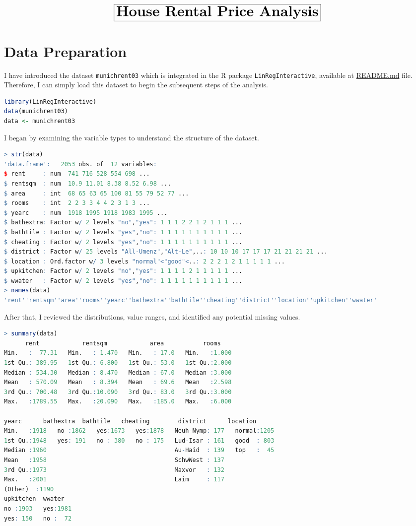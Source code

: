 \documentclass[15pt,a4paper]{report}
\begin{document}
\[
	\boxed{\huge \textbf{House Rental Price Analysis}}
\]
\section*{Data Preparation}
I have introduced the dataset \lstinline[language=R]|munichrent03| which is integrated in the R package \lstinline[language=R]|LinRegInteractive|, available at \href{https://github.com/taitran0102/rent-analysis/blob/main/README.md}{README.md} file. Therefore, I can simply load this dataset to begin the subsequent steps of the analysis.
\begin{lstlisting}[language=R]
library(LinRegInteractive)
data(munichrent03)
data <- munichrent03 
\end{lstlisting}
I began by examining the variable types to understand the structure of the dataset. 
\begin{lstlisting}[language=R]
> str(data)
'data.frame':	2053 obs. of  12 variables:
$ rent     : num  741 716 528 554 698 ...
$ rentsqm  : num  10.9 11.01 8.38 8.52 6.98 ...
$ area     : int  68 65 63 65 100 81 55 79 52 77 ...
$ rooms    : int  2 2 3 3 4 4 2 3 1 3 ...
$ yearc    : num  1918 1995 1918 1983 1995 ...
$ bathextra: Factor w/ 2 levels "no","yes": 1 1 1 2 2 1 2 1 1 1 ...
$ bathtile : Factor w/ 2 levels "yes","no": 1 1 1 1 1 1 1 1 1 1 ...
$ cheating : Factor w/ 2 levels "yes","no": 1 1 1 1 1 1 1 1 1 1 ...
$ district : Factor w/ 25 levels "All-Umenz","Alt-Le",..: 10 10 10 17 17 17 21 21 21 21 ...
$ location : Ord.factor w/ 3 levels "normal"<"good"<..: 2 2 2 1 2 1 1 1 1 1 ...
$ upkitchen: Factor w/ 2 levels "no","yes": 1 1 1 1 2 1 1 1 1 1 ...
$ wwater   : Factor w/ 2 levels "yes","no": 1 1 1 1 1 1 1 1 1 1 ...
> names(data)
'rent''rentsqm''area''rooms''yearc''bathextra''bathtile''cheating''district''location''upkitchen''wwater'
\end{lstlisting}
After that, I reviewed the distributions, value ranges, and identified any potential missing values.
\begin{lstlisting}[language=R]
> summary(data)
      rent            rentsqm            area           rooms      
Min.   :  77.31   Min.   : 1.470   Min.   : 17.0   Min.   :1.000  
1st Qu.: 389.95   1st Qu.: 6.800   1st Qu.: 53.0   1st Qu.:2.000  
Median : 534.30   Median : 8.470   Median : 67.0   Median :3.000  
Mean   : 570.09   Mean   : 8.394   Mean   : 69.6   Mean   :2.598  
3rd Qu.: 700.48   3rd Qu.:10.090   3rd Qu.: 83.0   3rd Qu.:3.000  
Max.   :1789.55   Max.   :20.090   Max.   :185.0   Max.   :6.000  

yearc      bathextra  bathtile   cheating        district      location   
Min.   :1918   no :1862   yes:1673   yes:1878   Neuh-Nymp: 177   normal:1205  
1st Qu.:1948   yes: 191   no : 380   no : 175   Lud-Isar : 161   good  : 803  
Median :1960                                    Au-Haid  : 139   top   :  45  
Mean   :1958                                    SchwWest : 137                
3rd Qu.:1973                                    Maxvor   : 132                
Max.   :2001                                    Laim     : 117                
(Other)  :1190                
upkitchen  wwater    
no :1903   yes:1981  
yes: 150   no :  72  

\end{lstlisting}
\end{document}
